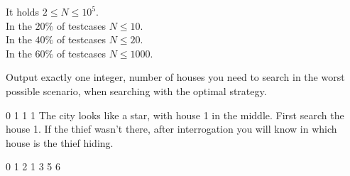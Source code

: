 \smallskip

It holds $2 \leq N \leq 10^5$.\\
In the $20\%$ of testcases $N \leq 10$.\\
In the $40\%$ of testcases $N \leq 20$.\\
In the $60\%$ of testcases $N \leq 1000$.


Output exactly one integer, number of houses you need to search in the worst possible scenario,
when searching with the optimal strategy.



0 1 1 1
\sampleCOMMENT
The city looks like a star, with house 1 in the middle.
\sampleCOMMENT
First search the house 1.
If the thief wasn't there, after interrogation you will know in which house is the thief hiding.
\sampleEND


\bigskip


0 1 2 1 3 5 6
\sampleEND



